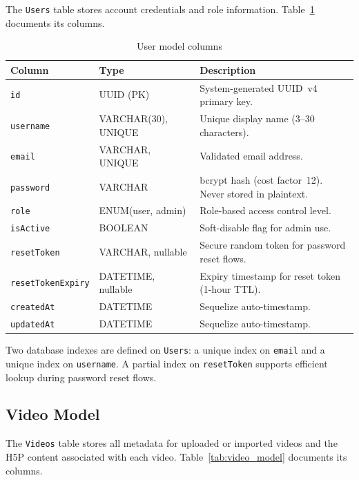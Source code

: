 The \texttt{Users} table stores account credentials and role information.
Table~\ref{tab:user_model} documents its columns.

\begin{table}[H]
  \centering
  \caption{User model columns}
  \label{tab:user_model}
  \begin{tabularx}{\linewidth}{llX}
    \toprule
    \textbf{Column}       & \textbf{Type}                 & \textbf{Description} \\
    \midrule
    \texttt{id}           & UUID (PK)                     & System-generated UUID~v4 primary key. \\
    \texttt{username}     & VARCHAR(30), UNIQUE           & Unique display name (3--30 characters). \\
    \texttt{email}        & VARCHAR, UNIQUE               & Validated email address. \\
    \texttt{password}     & VARCHAR                       & bcrypt hash (cost factor~12). Never stored in plaintext. \\
    \texttt{role}         & ENUM(user, admin)             & Role-based access control level. \\
    \texttt{isActive}     & BOOLEAN                       & Soft-disable flag for admin use. \\
    \texttt{resetToken}   & VARCHAR, nullable             & Secure random token for password reset flows. \\
    \texttt{resetTokenExpiry} & DATETIME, nullable        & Expiry timestamp for reset token (1-hour TTL). \\
    \texttt{createdAt}    & DATETIME                      & Sequelize auto-timestamp. \\
    \texttt{updatedAt}    & DATETIME                      & Sequelize auto-timestamp. \\
    \bottomrule
  \end{tabularx}
\end{table}

Two database indexes are defined on \texttt{Users}: a unique index on
\texttt{email} and a unique index on \texttt{username}. A partial index on
\texttt{resetToken} supports efficient lookup during password reset flows.

\subsection{Video Model}

The \texttt{Videos} table stores all metadata for uploaded or imported videos
and the H5P content associated with each video. Table~\ref{tab:video_model}
documents its columns.

